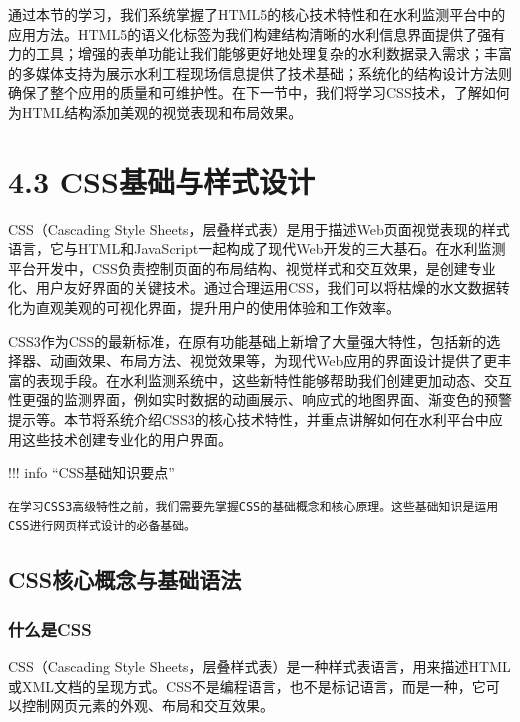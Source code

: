 通过本节的学习，我们系统掌握了HTML5的核心技术特性和在水利监测平台中的应用方法。HTML5的语义化标签为我们构建结构清晰的水利信息界面提供了强有力的工具；增强的表单功能让我们能够更好地处理复杂的水利数据录入需求；丰富的多媒体支持为展示水利工程现场信息提供了技术基础；系统化的结构设计方法则确保了整个应用的质量和可维护性。在下一节中，我们将学习CSS技术，了解如何为HTML结构添加美观的视觉表现和布局效果。

\hypertarget{cssux57faux7840ux4e0eux6837ux5f0fux8bbeux8ba1}{%
\section{4.3 CSS基础与样式设计}\label{cssux57faux7840ux4e0eux6837ux5f0fux8bbeux8ba1}}

CSS（Cascading Style Sheets，层叠样式表）是用于描述Web页面视觉表现的样式语言，它与HTML和JavaScript一起构成了现代Web开发的三大基石。在水利监测平台开发中，CSS负责控制页面的布局结构、视觉样式和交互效果，是创建专业化、用户友好界面的关键技术。通过合理运用CSS，我们可以将枯燥的水文数据转化为直观美观的可视化界面，提升用户的使用体验和工作效率。

CSS3作为CSS的最新标准，在原有功能基础上新增了大量强大特性，包括新的选择器、动画效果、布局方法、视觉效果等，为现代Web应用的界面设计提供了更丰富的表现手段。在水利监测系统中，这些新特性能够帮助我们创建更加动态、交互性更强的监测界面，例如实时数据的动画展示、响应式的地图界面、渐变色的预警提示等。本节将系统介绍CSS3的核心技术特性，并重点讲解如何在水利平台中应用这些技术创建专业化的用户界面。

!!! info ``CSS基础知识要点''

\begin{verbatim}
在学习CSS3高级特性之前，我们需要先掌握CSS的基础概念和核心原理。这些基础知识是运用CSS进行网页样式设计的必备基础。
\end{verbatim}

\hypertarget{cssux6838ux5fc3ux6982ux5ff5ux4e0eux57faux7840ux8bedux6cd5}{%
\subsection{CSS核心概念与基础语法}\label{cssux6838ux5fc3ux6982ux5ff5ux4e0eux57faux7840ux8bedux6cd5}}

\hypertarget{ux4ec0ux4e48ux662fcss}{%
\subsubsection{什么是CSS}\label{ux4ec0ux4e48ux662fcss}}

CSS（Cascading Style Sheets，层叠样式表）是一种样式表语言，用来描述HTML或XML文档的呈现方式。CSS不是编程语言，也不是标记语言，而是一种，它可以控制网页元素的外观、布局和交互效果。


